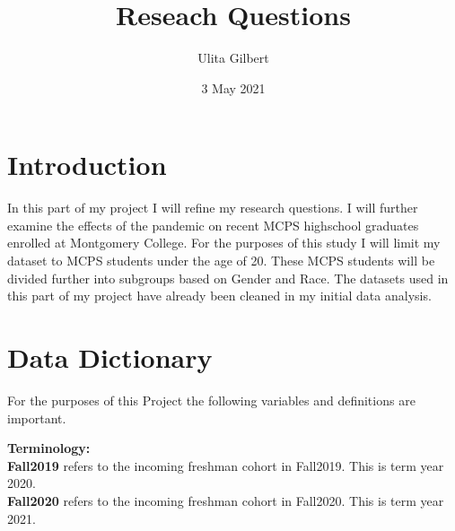 \documentclass[]{article}
\title{Reseach Questions}
\author{Ulita Gilbert}
\date{3 May 2021}
\begin{document}
\maketitle

{
\setcounter{tocdepth}{2}
\tableofcontents
}
\hypertarget{introduction}{%
\section{Introduction}\label{introduction}}

In this part of my project I will refine my research questions. I will
further examine the effects of the pandemic on recent MCPS highschool
graduates enrolled at Montgomery College. For the purposes of this study
I will limit my dataset to MCPS students under the age of 20. These MCPS
students will be divided further into subgroups based on Gender and
Race. The datasets used in this part of my project have already been
cleaned in my initial data analysis.

\hypertarget{data-dictionary}{%
\section{Data Dictionary}\label{data-dictionary}}

For the purposes of this Project the following variables and definitions
are important.

\textbf{Terminology:}\\
\textbf{Fall2019} refers to the incoming freshman cohort in Fall2019.
This is term year 2020.\\
\textbf{Fall2020} refers to the incoming freshman cohort in Fall2020.
This is term year 2021.
\end{document}
